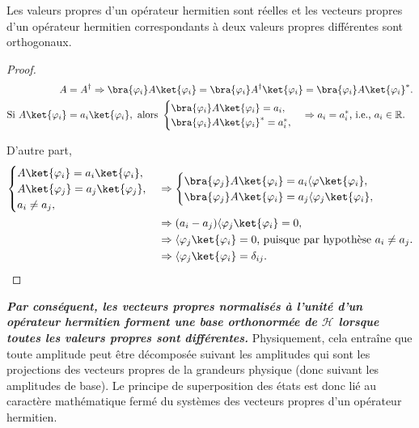 \colorbox[gray]{0.8}{
\parbox[c]{0.9\textwidth}{
\begin{theorem}
\label{pr:VOrth} Les valeurs propres d'un opérateur hermitien sont réelles et
les vecteurs propres d'un opérateur hermitien correspondants à deux valeurs
propres différentes sont orthogonaux.
\end{theorem}
}}\medskip

\begin{proof}
\begin{align}
A  &  =A^{\dagger}\Rightarrow\bra{\varphi_{i}}A\ket{\varphi_{i}}
=\bra{\varphi_{i}}A^{\dagger}\ket{\varphi_{i}}
=\bra{\varphi_{i}}A\ket{\varphi_{i}}^{\ast}.\nonumber\\
\text{Si }A\ket{\varphi_{i}}  &  =a_{i}\ket{\varphi_{i}},
\text{ alors }
\begin{cases}
\bra{\varphi_{i}}A\ket{\varphi_{i}}=a_{i},\\
\bra{\varphi_{i}}A\ket{\varphi_{i}}^{\ast}=a_{i}^{\ast},
\end{cases}
\Rightarrow a_{i}=a_{i}^{\ast}\text{, i.e., }a_{i}\in\mathbb{R}.
\end{align}

D'autre part,
\begin{subequations}%
\begin{align}
\begin{cases}
A\ket{\varphi_{i}} =a_{i}\ket{\varphi_{i}},\\
A\ket{\varphi_{j}} =a_{j}\ket{\varphi_{j}},\\
a_{i}\neq a_{j},
\end{cases}
&  \Rightarrow
\begin{cases}
\bra{\varphi_{j}}A\ket{\varphi_{i}}=a_{i}\langle\varphi\ket{\varphi_{i}},\\
\bra{\varphi_{j}}A\ket{\varphi_{i}}=a_{j}\langle\varphi_{j}\ket{\varphi_{i}},
\end{cases}\\
&  \Rightarrow(a_{i}-a_{j})\langle\varphi_{j}\ket{\varphi_{i}}=0,\\
&  \Rightarrow\langle\varphi_{j}\ket{\varphi_{i}} =0\text{, puisque par
hypothèse }a_{i}\neq a_{j}.\nonumber\\
&  \Rightarrow\langle\varphi_{j}\ket{\varphi_{i}}=\delta_{ij}.
\end{align}%
\end{subequations}
\end{proof}

\textbf{\emph{Par conséquent, les vecteurs propres normalisés à l'unité d'un
opérateur hermitien forment une base orthonormée de $\mathcal{H}$ lorsque toutes
les valeurs propres sont différentes.}} Physiquement, cela entraîne que toute
amplitude peut être décomposée suivant les amplitudes qui sont les projections
des vecteurs propres de la grandeurs physique (donc suivant les amplitudes de
base). Le principe de superposition des états est donc lié au caractère
mathématique fermé du systèmes des vecteurs propres d'un opérateur hermitien.

